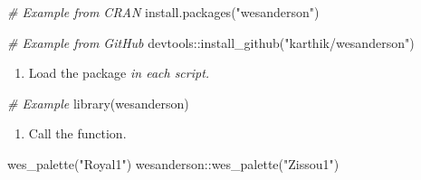 \documentclass[
]{book}
\newenvironment{Shaded}{\begin{snugshade}}{\end{snugshade}}
\newcommand{\CommentTok}[1]{\textcolor[rgb]{0.56,0.35,0.01}{\textit{#1}}}
\newcommand{\FunctionTok}[1]{\textcolor[rgb]{0.00,0.00,0.00}{#1}}
\newcommand{\NormalTok}[1]{#1}
\newcommand{\SpecialCharTok}[1]{\textcolor[rgb]{0.00,0.00,0.00}{#1}}
\newcommand{\StringTok}[1]{\textcolor[rgb]{0.31,0.60,0.02}{#1}}
\providecommand{\tightlist}{%
  \setlength{\itemsep}{0pt}\setlength{\parskip}{0pt}}
\begin{document}
\begin{Shaded}
\begin{Highlighting}[]
\CommentTok{\# Example from CRAN}
\FunctionTok{install.packages}\NormalTok{(}\StringTok{"wesanderson"}\NormalTok{)}

\CommentTok{\# Example from GitHub}
\NormalTok{devtools}\SpecialCharTok{::}\FunctionTok{install\_github}\NormalTok{(}\StringTok{"karthik/wesanderson"}\NormalTok{)}
\end{Highlighting}
\end{Shaded}

\begin{enumerate}
\def\labelenumi{\arabic{enumi}.}
\setcounter{enumi}{1}
\tightlist
\item
  Load the package \emph{in each script.}
\end{enumerate}

\begin{Shaded}
\begin{Highlighting}[]
\CommentTok{\# Example}
\FunctionTok{library}\NormalTok{(wesanderson)}
\end{Highlighting}
\end{Shaded}

\begin{enumerate}
\def\labelenumi{\arabic{enumi}.}
\setcounter{enumi}{2}
\tightlist
\item
  Call the function.
\end{enumerate}

\begin{Shaded}
\begin{Highlighting}[]
\FunctionTok{wes\_palette}\NormalTok{(}\StringTok{"Royal1"}\NormalTok{)}
\NormalTok{wesanderson}\SpecialCharTok{::}\FunctionTok{wes\_palette}\NormalTok{(}\StringTok{"Zissou1"}\NormalTok{)}
\end{Highlighting}
\end{Shaded}
\end{document}

